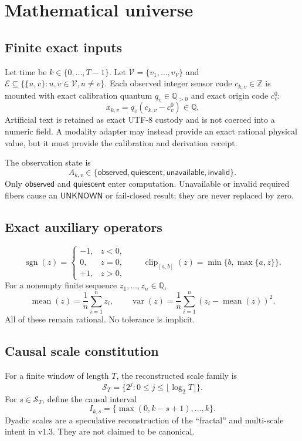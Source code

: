 \documentclass[11pt,oneside]{article}
\newcommand{\Q}{\mathbb{Q}}
\newcommand{\Z}{\mathbb{Z}}
\newcommand{\sgn}{\operatorname{sgn}}
\newcommand{\clip}{\operatorname{clip}}
\newcommand{\Vertices}{\mathcal{V}}
\newcommand{\Edges}{\mathcal{E}}
\newcommand{\Scales}{\mathcal{S}}
\begin{document}
\section{Mathematical universe}

\subsection{Finite exact inputs}

Let time be \(k\in\{0,\ldots,T-1\}\). Let
\(\Vertices=\{v_1,\ldots,v_V\}\) and
\(\Edges\subseteq\{\{u,v\}:u,v\in\Vertices,u\neq v\}\).
Each observed integer sensor code \(c_{k,v}\in\Z\) is mounted with exact
calibration quantum \(q_v\in\Q_{>0}\) and exact origin code \(c_v^0\):
\[
  x_{k,v}=q_v(c_{k,v}-c_v^0)\in\Q.
\]
Artificial text is retained as exact UTF-8 custody and is not coerced into a
numeric field. A modality adapter may instead provide an exact rational
physical value, but it must provide the calibration and derivation receipt.

The observation state is
\[
  A_{k,v}\in
  \{\mathsf{observed},\mathsf{quiescent},
    \mathsf{unavailable},\mathsf{invalid}\}.
\]
Only \(\mathsf{observed}\) and \(\mathsf{quiescent}\) enter computation.
Unavailable or invalid required fibers cause an \(\mathsf{UNKNOWN}\) or
fail-closed result; they are never replaced by zero.

\subsection{Exact auxiliary operators}

\[
\sgn(z)=
\begin{cases}
-1,&z<0,\\
0,&z=0,\\
+1,&z>0,
\end{cases}
\qquad
\clip_{[a,b]}(z)=\min\{b,\max\{a,z\}\}.
\]
For a nonempty finite sequence \(z_1,\ldots,z_n\in\Q\),
\[
  \operatorname{mean}(z)=\frac{1}{n}\sum_{i=1}^n z_i,
  \qquad
  \operatorname{var}(z)=
  \frac{1}{n}\sum_{i=1}^n
  \left(z_i-\operatorname{mean}(z)\right)^2.
\]
All of these remain rational. No tolerance is implicit.

\subsection{Causal scale constitution}

For a finite window of length \(T\), the reconstructed scale family is
\[
  \Scales_T=\{2^j:0\leq j\leq\lfloor\log_2 T\rfloor\}.
\]
For \(s\in\Scales_T\), define the causal interval
\[
  I_{k,s}=\{\max(0,k-s+1),\ldots,k\}.
\]
Dyadic scales are a speculative reconstruction of the ``fractal'' and
multi-scale intent in v1.3. They are not claimed to be canonical.
\end{document}

